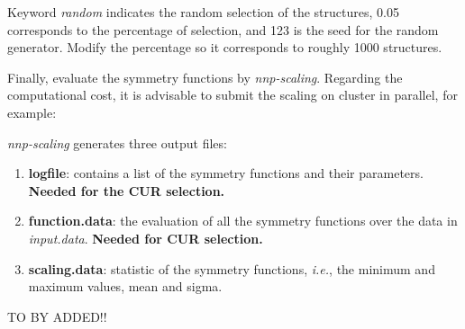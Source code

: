 \documentclass[12pt]{article}
\begin{document}
\begin{center}
\end{center}

Keyword \textit{random} indicates the random selection of the structures, 0.05 corresponds to the percentage of selection, and 123 is the seed for the random generator. Modify the percentage so it corresponds to roughly 1000 structures.

Finally, evaluate the symmetry functions by \textit{nnp-scaling}. Regarding the computational cost, it is advisable to submit the scaling on cluster in parallel, for example:

\begin{center}
\end{center}


\textit{nnp-scaling} generates three output files:
\begin{enumerate}
    \item \textbf{logfile}: contains a list of the symmetry functions and their parameters. \textbf{Needed for the CUR selection.}
    \item \textbf{function.data}: the evaluation of all the symmetry functions over the data in \textit{input.data}. \textbf{Needed for CUR selection.}
    \item \textbf{scaling.data}: statistic of the symmetry functions, \textit{i.e.}, the minimum and maximum values, mean and sigma.
\end{enumerate}

TO BY ADDED!!
\end{document}
